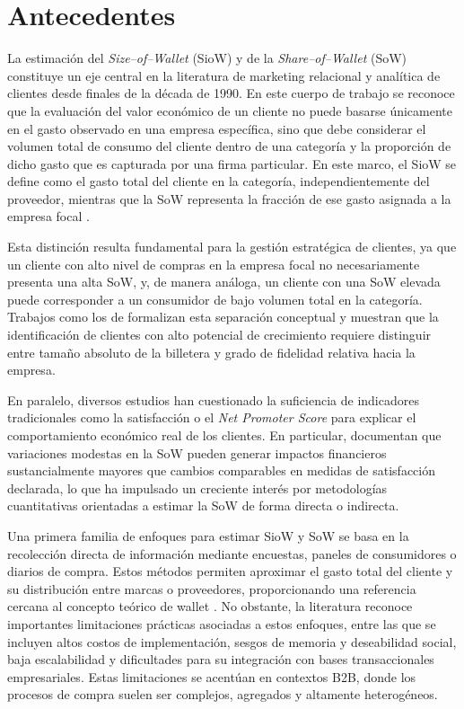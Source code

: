 \section{Antecedentes}
\label{sec:antecedentes}

La estimación del \emph{Size--of--Wallet} (SioW) y de la \emph{Share--of--Wallet} (SoW) constituye un eje central en la literatura de marketing relacional y analítica de clientes desde finales de la década de 1990. En este cuerpo de trabajo se reconoce que la evaluación del valor económico de un cliente no puede basarse únicamente en el gasto observado en una empresa específica, sino que debe considerar el volumen total de consumo del cliente dentro de una categoría y la proporción de dicho gasto que es capturada por una firma particular. En este marco, el SioW se define como el gasto total del cliente en la categoría, independientemente del proveedor, mientras que la SoW representa la fracción de ese gasto asignada a la empresa focal \cite{du2007size,glady2009predicting}.

Esta distinción resulta fundamental para la gestión estratégica de clientes, ya que un cliente con alto nivel de compras en la empresa focal no necesariamente presenta una alta SoW, y, de manera análoga, un cliente con una SoW elevada puede corresponder a un consumidor de bajo volumen total en la categoría. Trabajos como los de \cite{du2007size} formalizan esta separación conceptual y muestran que la identificación de clientes con alto potencial de crecimiento requiere distinguir entre tamaño absoluto de la billetera y grado de fidelidad relativa hacia la empresa.

En paralelo, diversos estudios han cuestionado la suficiencia de indicadores tradicionales como la satisfacción o el \emph{Net Promoter Score} para explicar el comportamiento económico real de los clientes. En particular, \cite{Keiningham2011} documentan que variaciones modestas en la SoW pueden generar impactos financieros sustancialmente mayores que cambios comparables en medidas de satisfacción declarada, lo que ha impulsado un creciente interés por metodologías cuantitativas orientadas a estimar la SoW de forma directa o indirecta.

Una primera familia de enfoques para estimar SioW y SoW se basa en la recolección directa de información mediante encuestas, paneles de consumidores o diarios de compra. Estos métodos permiten aproximar el gasto total del cliente y su distribución entre marcas o proveedores, proporcionando una referencia cercana al concepto teórico de wallet \cite{du2007size}. No obstante, la literatura reconoce importantes limitaciones prácticas asociadas a estos enfoques, entre las que se incluyen altos costos de implementación, sesgos de memoria y deseabilidad social, baja escalabilidad y dificultades para su integración con bases transaccionales empresariales. Estas limitaciones se acentúan en contextos B2B, donde los procesos de compra suelen ser complejos, agregados y altamente heterogéneos.


